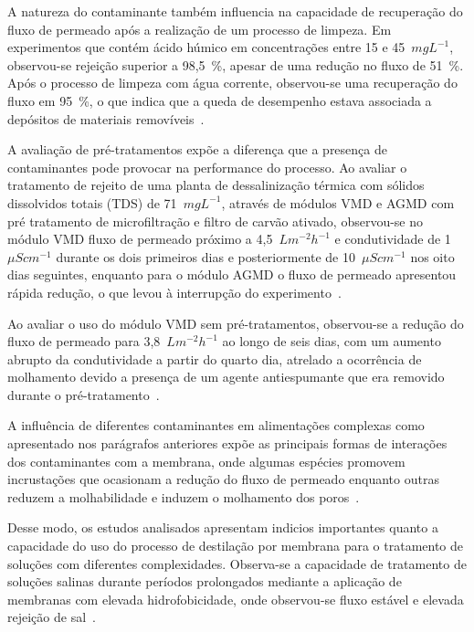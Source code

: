 A natureza do contaminante também influencia na capacidade de recuperação do fluxo de permeado após a realização de um processo de limpeza. Em experimentos que contém ácido húmico em concentrações entre 15 e 45~$mgL^{-1}$, observou-se rejeição superior a 98,5~\%, apesar de uma redução no fluxo de 51~\%. Após o processo de limpeza com água corrente, observou-se uma recuperação do fluxo em 95~\%, o que indica que a queda de desempenho estava associada a depósitos de materiais removíveis~\cite{Abdelrazeq2022DCMD}.

A avaliação de pré-tratamentos expõe a diferença que a presença de contaminantes pode provocar na performance do processo. Ao avaliar o tratamento de rejeito de uma planta de dessalinização térmica com sólidos dissolvidos totais (TDS) de 71~$mgL^{-1}$, através de módulos VMD e AGMD com pré tratamento de microfiltração e filtro de carvão ativado, observou-se no módulo VMD fluxo de permeado próximo a 4,5~$Lm^{-2}h^{-1}$ e condutividade de 1~$\mu Scm^{-1}$ durante os dois primeiros dias e posteriormente de 10~$\mu Scm^{-1}$ nos oito dias seguintes, enquanto para o módulo AGMD o fluxo de permeado apresentou rápida redução, o que levou à interrupção do experimento~\cite{Adham2023}.

Ao avaliar o uso do módulo VMD sem pré-tratamentos, observou-se a redução do fluxo de permeado para 3,8~$Lm^{-2}h^{-1}$ ao longo de seis dias, com um aumento abrupto da condutividade a partir do quarto dia, atrelado a ocorrência de molhamento devido a presença de um agente antiespumante que era removido durante o pré-tratamento~\cite{Adham2023}.

A influência de diferentes contaminantes em alimentações complexas como apresentado nos parágrafos anteriores expõe as principais formas de interações dos contaminantes com a membrana, onde algumas espécies promovem incrustações que ocasionam a redução do fluxo de permeado enquanto outras reduzem a molhabilidade e induzem o molhamento dos poros~\cite{Adham2023,Abdelrazeq2022DCMD}.

Desse modo, os estudos analisados apresentam indicios importantes quanto a capacidade do uso do processo de destilação por membrana para o tratamento de soluções com diferentes complexidades. Observa-se a capacidade de tratamento de soluções salinas durante períodos prolongados mediante a aplicação de membranas com elevada hidrofobicidade, onde observou-se fluxo estável e elevada rejeição de sal~\cite{Su2017,Woo2021ElectrospunMD,Suga2021VMD,Kujawa_PVDF_SWCNH}.

